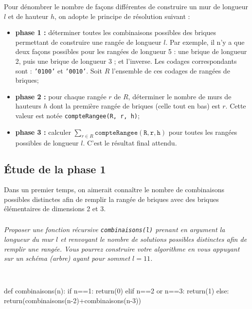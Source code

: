 Pour dénombrer le nombre de façons différentes de construire un mur de longueur $l$ et de hauteur $h$, on adopte le principe de résolution suivant :
\begin{itemize}
\item \textbf{phase 1 :} déterminer toutes les combinaisons possibles des briques permettant de construire une rangée de longueur $l$. Par exemple, il n'y a que deux façons possibles pour les rangées de longueur 5 : une brique de longueur 2, puis une brique de longueur 3 ; et l'inverse. Les codages correspondants sont : \texttt{'0100'} et \texttt{'0010'}. Soit $R$ l'ensemble de ces codages de rangées de briques;
\item \textbf{phase 2 :} pour chaque rangée $r$ de $R$, déterminer le nombre de murs de hauteurs $h$ dont la première rangée de briques (celle tout en bas) est $r$. Cette valeur est notée \texttt{compteRangee(R, r, h)};
\item \textbf{phase 3 :} calculer $\sum \limits_{r \in R} \mathtt{compteRangee(R,r,h)}$ pour toutes les rangées possibles de longueur $l$. C'est le résultat final attendu.
\end{itemize}




\subsection*{\'Etude de la phase 1}
\label{ssec:phase1}

Dans un premier temps, on aimerait connaître le nombre de combinaisons possibles distinctes afin de remplir la rangée de briques avec des briques élémentaires de dimensions 2 et 3.

\subparagraph{}\textit{Proposer une fonction récursive \texttt{combinaisons(l)} prenant en argument la longueur du mur $l$ et renvoyant le nombre de solutions possibles distinctes afin de remplir une rangée. Vous pourrez construire votre algorithme en vous appuyant sur un schéma (arbre) ayant pour sommet $l=11$.}

\ifprof
\begin{corrige}~\\

\begin{python}
def combinaisons(n):
    if n==1:
        return(0)
    elif n==2 or n==3:
        return(1)
    else:
        return(combinaisons(n-2)+combinaisons(n-3))
\end{python}
\end{corrige}
\else
\fi



